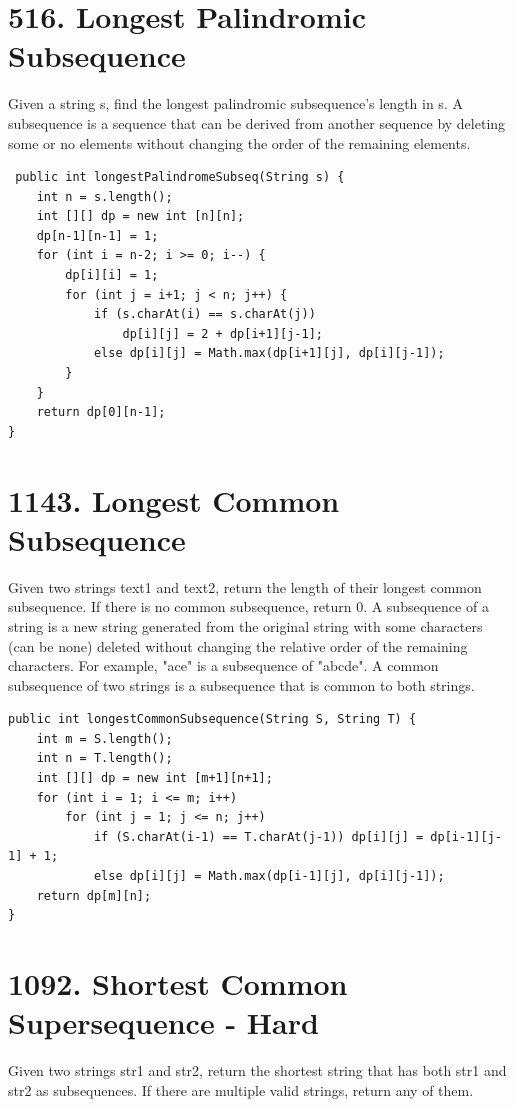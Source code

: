 \documentclass[9pt, b5paaper]{book}
\begin{document}
\section{516. Longest Palindromic Subsequence}
\label{sec-2-30}
Given a string s, find the longest palindromic subsequence's length in s.
A subsequence is a sequence that can be derived from another sequence by deleting some or no elements without changing the order of the remaining elements.
\begin{verbatim}
 public int longestPalindromeSubseq(String s) {
    int n = s.length();
    int [][] dp = new int [n][n];
    dp[n-1][n-1] = 1;
    for (int i = n-2; i >= 0; i--) {
        dp[i][i] = 1;
        for (int j = i+1; j < n; j++) {
            if (s.charAt(i) == s.charAt(j))
                dp[i][j] = 2 + dp[i+1][j-1];
            else dp[i][j] = Math.max(dp[i+1][j], dp[i][j-1]);
        }
    }
    return dp[0][n-1];
}
\end{verbatim}

\section{1143. Longest Common Subsequence}
\label{sec-2-31}
Given two strings text1 and text2, return the length of their longest common subsequence. If there is no common subsequence, return 0.
A subsequence of a string is a new string generated from the original string with some characters (can be none) deleted without changing the relative order of the remaining characters.
For example, "ace" is a subsequence of "abcde".
A common subsequence of two strings is a subsequence that is common to both strings.
\begin{verbatim}
public int longestCommonSubsequence(String S, String T) {
    int m = S.length();
    int n = T.length();
    int [][] dp = new int [m+1][n+1];
    for (int i = 1; i <= m; i++) 
        for (int j = 1; j <= n; j++) 
            if (S.charAt(i-1) == T.charAt(j-1)) dp[i][j] = dp[i-1][j-1] + 1;
            else dp[i][j] = Math.max(dp[i-1][j], dp[i][j-1]);
    return dp[m][n];
}
\end{verbatim}

\section{1092. Shortest Common Supersequence - Hard}
\label{sec-2-32}
Given two strings str1 and str2, return the shortest string that has both str1 and str2 as subsequences. If there are multiple valid strings, return any of them.
\end{document}
